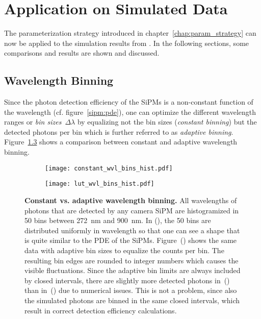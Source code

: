\chapter{Application on Simulated Data}

The parameterization strategy introduced in chapter~\ref{chap:param_strategy} can now be applied to the simulation results from \geant. In the following sections, some comparisons and results are shown and discussed.

\section{Wavelength Binning}\label{sec:wvl_binning}

Since the photon detection efficiency of the SiPMs is a non-constant function of the wavelength (cf. figure~\ref{sipm:pde}), one can optimize the different wavelength ranges or \textit{bin sizes}~$\Delta\lambda$ by equalizing not the bin sizes (\textit{constant binning}) but the detected photons per bin which is further referred to as \textit{adaptive binning}. Figure~\ref{param:wvl_binning} shows a comparison between constant and adaptive wavelength binning.

\begin{figure}[H]
	\centering
	\begin{subfigure}[t]{0.49\textwidth}
		\texttt{[image: constant\_wvl\_bins\_hist.pdf]}
		\label{param:wvl_binning:constant}
	\end{subfigure}
	\hfill
	\begin{subfigure}[t]{0.49\textwidth}
		\texttt{[image: lut\_wvl\_bins\_hist.pdf]}
		\label{param:wvl_binning:adaptive}
	\end{subfigure}
	\caption[Constant vs. adaptive wavelength binning]{\textbf{Constant vs. adaptive wavelength binning.} All wavelengths of photons that are detected by any camera SiPM are histogramized in \num{50} bins between \SI{272}{\nano\meter} and \SI{900}{\nano\meter}. In (), the \num{50} bins are distributed uniformly in wavelength so that one can see a shape that is quite similar to the PDE of the SiPMs. Figure~() shows the same data with adaptive bin sizes to equalize the counts per bin. The resulting bin edges are rounded to integer numbers which causes the visible fluctuations. Since the adaptive bin limits are always included by closed intervals, there are slightly more detected photons in~() than in~() due to numerical issues. This is not a problem, since also the simulated photons are binned in the same closed intervals, which result in correct detection efficiency calculations.}
	\label{param:wvl_binning}
\end{figure}

